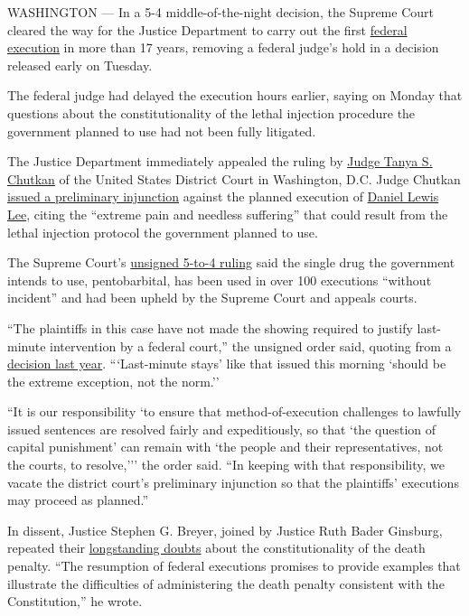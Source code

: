 WASHINGTON --- In a 5-4 middle-of-the-night decision, the Supreme Court
cleared the way for the Justice Department to carry out the first
\href{https://www.nytimes.com/2020/07/16/us/politics/wesley-ira-purkey-executed.html}{federal
execution} in more than 17 years, removing a federal judge's hold in a
decision released early on Tuesday.

The federal judge had delayed the execution hours earlier, saying on
Monday that questions about the constitutionality of the lethal
injection procedure the government planned to use had not been fully
litigated.

The Justice Department immediately appealed the ruling by
\href{https://www.dcd.uscourts.gov/content/district-judge-tanya-s-chutkan}{Judge
Tanya S. Chutkan} of the United States District Court in Washington,
D.C. Judge Chutkan
\href{https://ecf.dcd.uscourts.gov/cgi-bin/show_public_doc?2019mc0145-135}{issued
a preliminary injunction} against the planned execution of
\href{https://www.nytimes.com/2020/07/14/us/politics/daniel-lewis-lee-execution-crime.html}{Daniel
Lewis Lee}, citing the ``extreme pain and needless suffering'' that
could result from the lethal injection protocol the government planned
to use.

The Supreme Court's
\href{https://www.supremecourt.gov/opinions/19pdf/20a8_970e.pdf}{unsigned
5-to-4 ruling} said the single drug the government intends to use,
pentobarbital, has been used in over 100 executions ``without incident''
and had been upheld by the Supreme Court and appeals courts.

``The plaintiffs in this case have not made the showing required to
justify last-minute intervention by a federal court,'' the unsigned
order said, quoting from a
\href{https://www.supremecourt.gov/opinions/18pdf/17-8151_1qm2.pdf}{decision
last year}. ```Last-minute stays' like that issued this morning `should
be the extreme exception, not the norm.''

``It is our responsibility `to ensure that method-of-execution
challenges to lawfully issued sentences are resolved fairly and
expeditiously, so that `the question of capital punishment' can remain
with `the people and their representatives, not the courts, to
resolve,''' the order said. ``In keeping with that responsibility, we
vacate the district court's preliminary injunction so that the
plaintiffs' executions may proceed as planned.''

In dissent, Justice Stephen G. Breyer, joined by Justice Ruth Bader
Ginsburg, repeated their
\href{https://www.nytimes.com/2015/11/04/us/politics/death-penalty-opponents-split-over-taking-issue-to-supreme-court.html}{longstanding
doubts} about the constitutionality of the death penalty. ``The
resumption of federal executions promises to provide examples that
illustrate the difficulties of administering the death penalty
consistent with the Constitution,'' he wrote.

